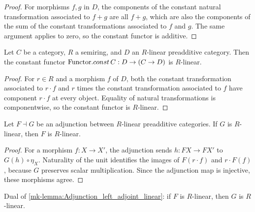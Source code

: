 \begin{proof}
  \leanok

For morphisms \(f,g\) in \(D\), the components of the constant natural transformation associated to \(f+g\) are all \(f+g\), which are also the components of the sum of the constant transformations associated to \(f\) and \(g\). The same argument applies to zero, so the constant functor is additive.
\end{proof}

\begin{lemma}\label{mk-lem:Functor_const_linear}
  \leanok

  Let \(C\) be a category, \(R\) a semiring, and \(D\) an \(R\)-linear preadditive category.
  Then the constant functor \(\mathrm{Functor}.const\, C : D \to (C \to D)\) is \(R\)-linear.
\end{lemma}

\begin{proof}
  \leanok

For \(r\in R\) and a morphism \(f\) of \(D\), both the constant transformation associated to \(r\cdot f\) and \(r\) times the constant transformation associated to \(f\) have component \(r\cdot f\) at every object. Equality of natural transformations is componentwise, so the constant functor is \(R\)-linear.
\end{proof}

\begin{lemma}\label{mk-lemma:Adjunction_left_adjoint_linear}
  \leanok

  Let \(F \dashv G\) be an adjunction between \(R\)-linear preadditive categories. If \(G\) is \(R\)-linear, then \(F\) is \(R\)-linear.
\end{lemma}

\begin{proof}
  \leanok
  For a morphism \(f:X\to X'\), the adjunction sends \(h:FX\to FX'\) to \(G(h)\circ\eta_X\). Naturality of the unit identifies the images of \(F(r\cdot f)\) and \(r\cdot F(f)\), because \(G\) preserves scalar multiplication. Since the adjunction map is injective, these morphisms agree.
\end{proof}

\begin{lemma}\label{mk-lemma:Adjunction_right_adjoint_linear}
  \leanok

  Dual of \ref{mk-lemma:Adjunction_left_adjoint_linear}: if \(F\) is \(R\)-linear, then \(G\) is \(R\)-linear.
\end{lemma}

